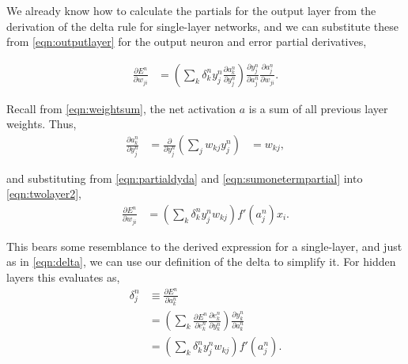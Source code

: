\documentclass[thesis]{subfiles}
\begin{document}
We already know how to calculate the partials for the output layer from the derivation of the delta rule for single-layer networks, and we can substitute these from \cref{eqn:outputlayer} for the output neuron and error partial derivatives,

\begin{equation}
\begin{aligned}
    \frac{\partial E^n}{\partial w_{ji}} &= \left( \sum_k \delta^n_k y^n_j \frac{\partial a^n_k}{\partial y^n_{j}}\right)
     \frac{\partial y^n_{j}}{\partial a^n_{j}} \frac{\partial a^n_{j}}{\partial w_{ji}}.
     \label{eqn:twolayer2}
\end{aligned}
\end{equation}

Recall from \cref{eqn:weightsum}, the net activation $a$ is a sum of all previous layer weights. Thus,
\begin{equation}
\begin{aligned}
    \frac{\partial a^n_k}{\partial y^n_{j}} &= \frac{\partial}{\partial y^n_{j}}\left(\sum_j w_{kj} y^n_{j} \right) &= w_{kj},
\end{aligned}
\end{equation}

and substituting from \cref{eqn:partialdyda} and \cref{eqn:sumonetermpartial} into \cref{eqn:twolayer2},
\begin{equation}
\begin{aligned}
    \frac{\partial E^n}{\partial w_{ji}} &= \left( \sum_k \delta^n_k y^n_j w_{kj}\right)
     f'\left( a^n_j \right) x_i.
     \label{eqn:twolayer3}
\end{aligned}
\end{equation}

This bears some resemblance to the derived expression for a single-layer, and just as in \cref{eqn:delta}, we can use our definition of the delta to simplify it. For hidden layers this evaluates as,
\begin{equation}
\label{eqn:deltahidden}
\begin{aligned}
    \delta^n_j &\equiv \frac{\partial E^n}{\partial a^n_k}\\
    &= \left( \sum_k \frac{\partial E^n}{\partial e^n_{k}} \frac{\partial e^n_{k}}{\partial y^n_{k}} \right) \frac{\partial y^n_{k}}{\partial a^n_k}\\
    &= \left(\sum_k \delta^n_k y^n_j w_{kj} \right) f'\left( a^n_j \right).
\end{aligned}
\end{equation}
\end{document}
